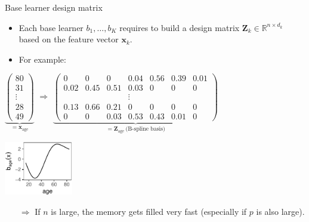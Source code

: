 \documentclass[ignorenonframetext,]{beamer}
\providecommand{\tightlist}{%
  \setlength{\itemsep}{0pt}\setlength{\parskip}{0pt}}
\begin{document}
\begin{frame}{Base learner design matrix}
\protect\hypertarget{base-learner-design-matrix}{}
\begin{itemize}
\tightlist
\item
  Each base learner \(b_1, \dots, b_K\) requires to build a design
  matrix \(\bm{Z}_k\in\mathbb{R}^{n\times d_k}\) based on the feature
  vector \(\bm{x}_k\).
\item
  For example:
\end{itemize}

\begin{minipage}{0.75\textwidth}
{\tiny $
\underbrace{\begin{pmatrix} 80 \\ 31 \\ \vdots \\ 28 \\ 49 \end{pmatrix}}_{= \bm{x}_{\text{age}}}
$}
{\Large $\Rightarrow$}
{\tiny $
\underbrace{\begin{pmatrix}
    0 & 0 & 0 & 0.04 & 0.56 & 0.39 & 0.01  \\
    0.02 & 0.45 & 0.51 & 0.03 & 0 & 0 & 0 \\
    & & & \vdots & & & \\
    0.13 & 0.66 & 0.21 & 0 & 0 & 0 & 0 \\
    0 & 0 & 0.03 & 0.53 & 0.43 & 0.01 & 0
\end{pmatrix}}_{=\bm{Z}_{\text{age}}\ \text{(B-spline basis)}}
$}\hspace{0.2cm}{\Large $\Rightarrow$}
\end{minipage}
\begin{minipage}{0.2\textwidth}
\phantom{a}\vspace{-0.2cm}\hspace*{0.5cm}

\includegraphics[width=3cm]{figures/unnamed-chunk-2-1} 
\end{minipage}
\begin{itemize}
\item[$\Rightarrow$] If $n$ is large, the memory gets filled very fast (especially if $p$ is also large).
\end{itemize}
\end{frame}
\end{document}
